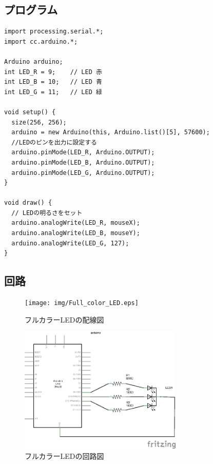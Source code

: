 \documentclass[11pt,a4paper]{jarticle}
\begin{document}
\subsection*{プログラム}
\begin{lstlisting}
import processing.serial.*;
import cc.arduino.*;
 
Arduino arduino;
int LED_R = 9;    // LED 赤
int LED_B = 10;   // LED 青
int LED_G = 11;   // LED 緑

void setup() {
  size(256, 256);
  arduino = new Arduino(this, Arduino.list()[5], 57600);
  //LEDのピンを出力に設定する
  arduino.pinMode(LED_R, Arduino.OUTPUT);
  arduino.pinMode(LED_B, Arduino.OUTPUT);
  arduino.pinMode(LED_G, Arduino.OUTPUT);
}

void draw() {
  // LEDの明るさをセット
  arduino.analogWrite(LED_R, mouseX);
  arduino.analogWrite(LED_B, mouseY);
  arduino.analogWrite(LED_G, 127);
}
\end{lstlisting}

\subsection*{回路}
\begin{figure}[h!]
 \begin{minipage}{0.5\columnwidth}
  \centering
  \texttt{[image: img/Full\_color\_LED.eps]}
  \caption{フルカラーLEDの配線図}
  \label{circuit}
 \end{minipage}
 \begin{minipage}{0.5\columnwidth}
  \centering
  \includegraphics[height=60mm]{img/Full_color_LED_circuit.eps}
  \caption{フルカラーLEDの回路図}
 \end{minipage}
\end{figure}
\end{document}
